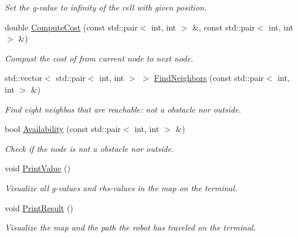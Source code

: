 \begin{DoxyCompactItemize}
\begin{DoxyCompactList}\small\item\em Set the g-\/value to infinity of the cell with given position. \end{DoxyCompactList}\item 
double \hyperlink{classMap_a011926cea282559f37768dadadf46f69}{Compute\+Cost} (const std\+::pair$<$ int, int $>$ \&, const std\+::pair$<$ int, int $>$ \&)
\begin{DoxyCompactList}\small\item\em Compust the cost of from current node to next node. \end{DoxyCompactList}\item 
std\+::vector$<$ std\+::pair$<$ int, int $>$ $>$ \hyperlink{classMap_acc6914f9c0c82c43a340f734444b5ead}{Find\+Neighbors} (const std\+::pair$<$ int, int $>$ \&)
\begin{DoxyCompactList}\small\item\em Find eight neighbos that are reachable\+: not a obstacle nor outside. \end{DoxyCompactList}\item 
bool \hyperlink{classMap_a5fe94fd021d5058ecab454ef937b2afe}{Availability} (const std\+::pair$<$ int, int $>$ \&)
\begin{DoxyCompactList}\small\item\em Check if the node is not a obstacle nor outside. \end{DoxyCompactList}\item 
void \hyperlink{classMap_a74f72513109a895c313de5bfbecb3735}{Print\+Value} ()
\begin{DoxyCompactList}\small\item\em Visualize all g-\/values and rhs-\/values in the map on the terminal. \end{DoxyCompactList}\item 
void \hyperlink{classMap_a807b37ec77cdc14d635399b1c1eb7099}{Print\+Result} ()
\begin{DoxyCompactList}\small\item\em Visualize the map and the path the robot has traveled on the terminal. \end{DoxyCompactList}\end{DoxyCompactItemize}
